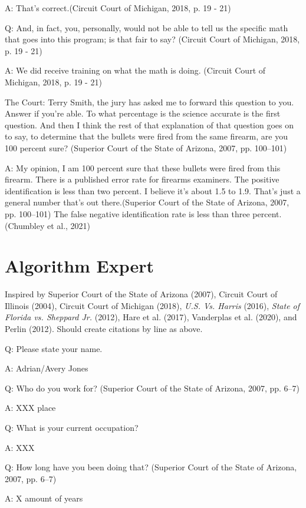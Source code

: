 \documentclass[print]{nuthesis}
\begin{document}
A: That's correct.(Circuit Court of Michigan, 2018, p. 19 - 21)

Q: And, in fact, you, personally, would not be able to tell us the specific math that goes into this program; is that fair to say? (Circuit Court of Michigan, 2018, p. 19 - 21)

A: We did receive training on what the math is doing. (Circuit Court of Michigan, 2018, p. 19 - 21)

The Court: Terry Smith, the jury has asked me to forward this question to you. Answer if you're able.
To what percentage is the science accurate is the first question. And then I think the rest of that explanation of that question goes on to say, to determine that the bullets were fired from the same firearm, are you 100 percent sure? (Superior Court of the State of Arizona, 2007, pp. 100--101)

A: My opinion, I am 100 percent sure that these bullets were fired from this firearm.
There is a published error rate for firearms examiners.
The positive identification is less than two percent.
I believe it's about 1.5 to 1.9. That's just a general number that's out there.(Superior Court of the State of Arizona, 2007, pp. 100--101)
The false negative identification rate is less than three percent. (Chumbley et al., 2021)

\hypertarget{algorithm-expert}{%
\section{Algorithm Expert}\label{algorithm-expert}}

Inspired by Superior Court of the State of Arizona (2007), Circuit Court of Illinois (2004), Circuit Court of Michigan (2018), \emph{{U.S.} Vs. {Harris}} (2016), \emph{State of {Florida} vs. Sheppard {Jr.}} (2012), Hare et al. (2017), Vanderplas et al. (2020), and Perlin (2012). Should create citations by line as above.

Q: Please state your name.

A: Adrian/Avery Jones

Q: Who do you work for? (Superior Court of the State of Arizona, 2007, pp. 6--7)

A: XXX place

Q: What is your current occupation?

A: XXX

Q: How long have you been doing that? (Superior Court of the State of Arizona, 2007, pp. 6--7)

A: X amount of years
\end{document}
